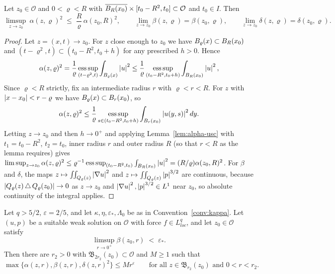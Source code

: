 \documentclass[11pt,reqno]{amsart}
\begin{document}
\begin{corollary}\label{cor:theta-usc}
Let $z_{0}\in\mathcal{O}$ and $0<\varrho<R$ with
$\overline{B_{R}(x_{0})}\times[t_{0}-R^{2},t_{0}]\subset\mathcal{O}$ and
$t_{0}\in I$. Then
\begin{equation}\label{eq:theta-usc}
  \limsup_{z\to z_{0}}\ \alpha(z,\varrho)^{2}\;\le\;\frac R\varrho\,\alpha(z_{0},R)^{2},
  \qquad
  \lim_{z\to z_{0}}\beta(z,\varrho)=\beta(z_{0},\varrho),
  \qquad
  \lim_{z\to z_{0}}\delta(z,\varrho)=\delta(z_{0},\varrho).
\end{equation}
\end{corollary}

\begin{proof}
Let $z=(x,t)\to z_{0}$. For $z$ close enough to $z_{0}$ we have
$B_{\varrho}(x)\subset B_{R}(x_{0})$ and
$(t-\varrho^{2},t)\subset(t_{0}-R^{2},t_{0}+h)$ for any prescribed $h>0$. Hence
\[
  \alpha(z,\varrho)^{2}
  =\frac1\varrho\operatorname*{ess\,sup}_{(t-\varrho^{2},t)}\int_{B_{\varrho}(x)}\left\lvert u \right\rvert^{2}
  \le\frac1\varrho\operatorname*{ess\,sup}_{(t_{0}-R^{2},t_{0}+h)}\int_{B_{R}(x_{0})}\left\lvert u \right\rvert^{2},
\]
Since $\varrho<R$ strictly, fix an intermediate radius $r$ with
$\varrho<r<R$. For $z$ with $\left\lvert x-x_{0} \right\rvert<r-\varrho$ we have
$B_{\varrho}(x)\subset B_{r}(x_{0})$, so
\[
  \alpha(z,\varrho)^{2}
  \le\frac1\varrho\operatorname*{ess\,sup}_{s\in(t_{0}-R^{2},t_{0}+h)}
     \int_{B_{r}(x_{0})}\left\lvert u(y,s) \right\rvert^{2}dy .
\]
Letting $z\to z_{0}$ and then $h\to0^{+}$ and applying
Lemma~\ref{lem:alpha-usc} with $t_{1}=t_{0}-R^{2}$, $t_{2}=t_{0}$, inner radius
$r$ and outer radius $R$ (so that $r<R$ as the lemma requires) gives
$\limsup_{z\to z_{0}}\alpha(z,\varrho)^{2}
 \le\varrho^{-1}\operatorname*{ess\,sup}_{(t_{0}-R^{2},t_{0})}\int_{B_{R}(x_{0})}\left\lvert u \right\rvert^{2}
 =(R/\varrho)\alpha(z_{0},R)^{2}$.
For $\beta$ and $\delta$, the maps
$z\mapsto\iint_{Q_{\varrho}(z)}\left\lvert \nabla u \right\rvert^{2}$ and
$z\mapsto\iint_{Q_{\varrho}(z)}\left\lvert p \right\rvert^{3/2}$ are continuous, because
$\left\lvert Q_{\varrho}(z)\,\triangle\,Q_{\varrho}(z_{0}) \right\rvert\to0$ as $z\to z_{0}$ and
$\left\lvert \nabla u \right\rvert^{2},\left\lvert p \right\rvert^{3/2}\in L^{1}$ near $z_{0}$, so absolute continuity
of the integral applies.
\end{proof}

\begin{proposition}\label{prop:morrey-decay}
Let $q>5/2$, $\varepsilon=2/5$, and let $\kappa,\eta,\varepsilon_{*},\Lambda_{0}$
be as in Convention~\ref{conv:kappa}. Let $(u,p)$ be a suitable weak solution on
$\mathcal{O}$ with force $f\in L^{q}_{loc}$, and let $z_{0}\in\mathcal{O}$
satisfy
\begin{equation}\label{eq:morrey-decay-hyp}
  \limsup_{r\to0^{+}}\beta(z_{0},r)\;<\;\varepsilon_{*}.
\end{equation}
Then there are $r_{2}>0$ with
$\mathfrak{B}_{2r_{2}}(z_{0})\subset\mathcal{O}$ and $M\ge1$ such that
\begin{equation}\label{eq:morrey-decay}
  \max\bigl\{\alpha(z,r),\beta(z,r),\delta(z,r)^{2}\bigr\}\le M r^{\varepsilon}
  \qquad\text{for all }z\in\mathfrak{B}_{r_{2}}(z_{0})\text{ and }0<r<r_{2}.
\end{equation}
\end{proposition}
\end{document}

